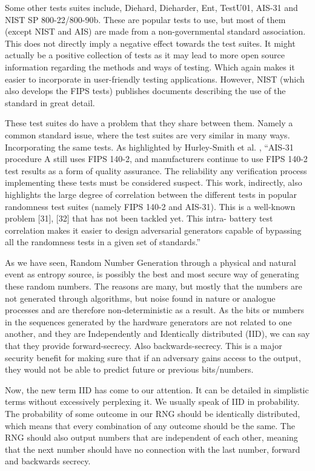 \documentclass[]{final_report}
\begin{document}
\par{Some other tests suites include, Diehard, Dieharder, Ent, TestU01, AIS-31 and NIST SP 800-22/800-90b. These are popular tests to use, but most of them (except NIST and AIS) are made from a non-governmental standard association. This does not directly imply a negative effect towards the test suites. It might actually be a positive collection of tests as it may lead to more open source information regarding the methods and ways of testing. Which again makes it easier to incorporate in user-friendly testing applications. However, NIST (which also develops the FIPS tests) publishes documents describing the use of the standard in great detail.}

\par{These test suites do have a problem that they share between them. Namely a common standard issue, where the test suites are very similar in many ways. Incorporating the same tests. As highlighted by Hurley-Smith et al. \cite{Smith:2020}, ``AIS-31 procedure A still uses FIPS 140-2, and manufacturers continue to use FIPS 140-2 test results as a form of quality assurance. The reliability any verification process implementing these tests must be considered suspect. This work, indirectly, also highlights the large degree of correlation between the different tests in popular randomness test suites (namely FIPS 140-2 and AIS-31). This is a well-known problem [31], [32] that has not been tackled yet. This intra- battery test correlation makes it easier to design adversarial generators capable of bypassing all the randomness tests in a given set of standards.''}

\par{As we have seen, Random Number Generation through a physical and natural event as entropy source, is possibly the best and most secure way of generating these random numbers. The reasons are many, but mostly that the numbers are not generated through algorithms, but noise found in nature or analogue processes and are therefore non-deterministic as a result. As the bits or numbers in the sequences generated by the hardware generators are not related to one another, and they are Independently and Identically distributed (IID), we can say that they provide forward-secrecy. Also backwards-secrecy. This is a major security benefit for making sure that if an adversary gains access to the output, they would not be able to predict future or previous bits/numbers.}

\par{Now, the new term IID has come to our attention. It can be detailed in simplistic terms without excessively perplexing it. We usually speak of IID in probability. The probability of some outcome in our RNG should be identically distributed, which means that every combination of any outcome should be the same. The RNG should also output numbers that are independent of each other, meaning that the next number should have no connection with the last number, forward and backwards secrecy.}
\end{document}
